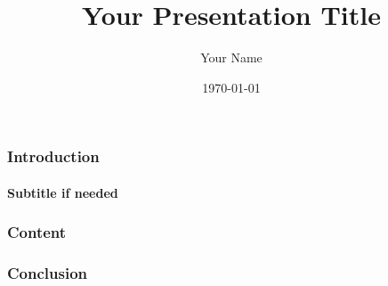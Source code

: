 \documentclass{beamer}
\title{Your Presentation Title}
\author{Your Name}
\date{\today}
\begin{document}
\frame{\titlepage}

\begin{frame}
\frametitle{Introduction}
\framesubtitle{Subtitle if needed}
\lipsum[1]
\end{frame}

\begin{frame}
\frametitle{Content}
\lipsum[2]
\end{frame}

\begin{frame}
\frametitle{Conclusion}
\lipsum[3]
\end{frame}
\end{document}
